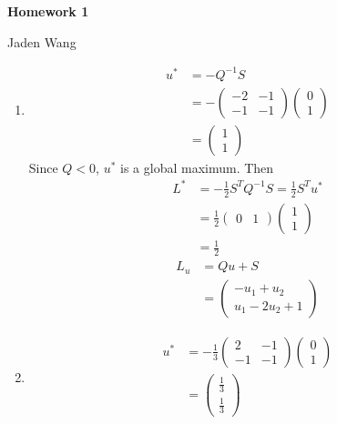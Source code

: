 \documentclass[12pt]{article}
\begin{document}
\centerline {\textsf{\textbf{\LARGE{Homework 1}}}}
\centerline {Jaden Wang}
\vspace{.15in}

\begin{problem}[1.1.1]
\begin{enumerate}[label=(\alph*)]
	\item 
	\begin{align*}
	u^* &= -Q^{-1}S \\
	    &= - \begin{pmatrix} -2&-1\\-1&-1 \end{pmatrix} \begin{pmatrix} 0\\1 \end{pmatrix}  \\
	    &= \begin{pmatrix} 1\\1 \end{pmatrix} 
\end{align*}
Since $ Q < 0$,  $ u^* $ is a global maximum. Then
\begin{align*}
	L^* &= -\frac{1}{2} S^{T}Q^{-1}S= \frac{1}{2} S^{T}u^* \\
	    &= \frac{1}{2} \begin{pmatrix} 0&1 \end{pmatrix} \begin{pmatrix} 1\\1 \end{pmatrix}  \\
	&= \frac{1}{2} 
\end{align*}
\begin{align*}
	L_u &= Qu + S \\
	&= \begin{pmatrix} -u_1+u_2\\u_1-2u_2 + 1 \end{pmatrix}  
\end{align*}
\item
\begin{align*}
	u^* &= - \frac{1}{3} \begin{pmatrix} 2&-1\\-1&-1 \end{pmatrix} \begin{pmatrix} 0\\1 \end{pmatrix} \\
	&= \begin{pmatrix} \frac{1}{3}\\\frac{1}{3} \end{pmatrix}  \\

\end{align*}
\end{enumerate}
\end{problem}
\end{document}
